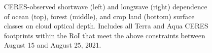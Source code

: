 \documentclass[12pt]{article}
\begin{document}
\begin{figure}[h!]
\begin{center}

        \end{center}
        \caption{CERES-observed shortwave (left) and longwave (right) dependence of ocean (top), forest (middle), and crop land (bottom) surface classes on cloud optical depth. Includes all Terra and Aqua CERES footprints within the RoI that meet the above constraints between August 15 and August 25, 2021.}
        \label{ocod1}
    \end{figure}
\end{document}
